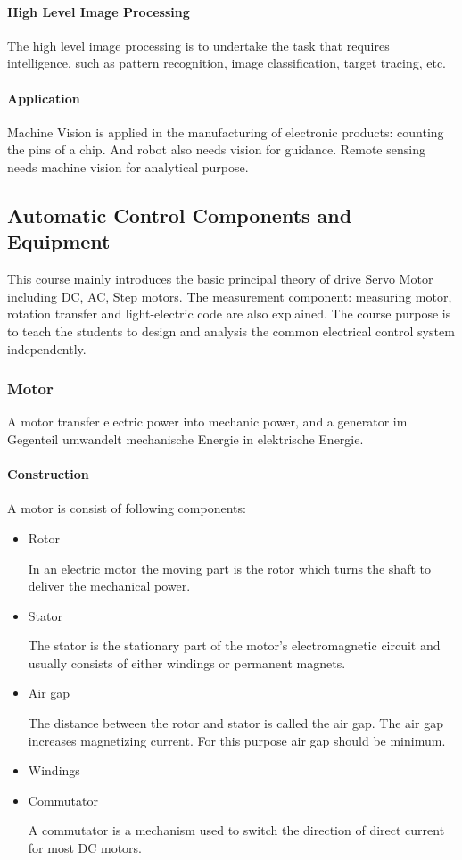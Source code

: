 \paragraph{High Level Image Processing} The high level image processing is to undertake the task that requires intelligence, such as pattern recognition, image classification, target tracing, etc.

\paragraph{Application} Machine Vision is applied in the manufacturing of electronic products: counting the pins of a chip. And robot also needs vision for guidance. Remote sensing needs machine vision for analytical purpose.

\subsection{Automatic Control Components and Equipment}

This course mainly introduces the basic principal theory of drive Servo Motor including DC, AC, Step motors. The measurement component: measuring motor, rotation transfer and light-electric code are also explained. The course purpose is to teach the students to design and analysis the common electrical control system independently.

\subsubsection{Motor}

A motor transfer electric power into mechanic power, and a generator im Gegenteil umwandelt mechanische Energie in elektrische Energie.

\paragraph{Construction}

A motor is consist of following components:
\begin{itemize}
  \item Rotor

  In an electric motor the moving part is the rotor which turns the shaft to deliver the mechanical power.

  \item Stator

  The stator is the stationary part of the motor's electromagnetic circuit and usually consists of either windings or permanent magnets.

  \item Air gap

  The distance between the rotor and stator is called the air gap. The air gap increases magnetizing current. For this purpose air gap should be minimum.

  \item Windings

  \item Commutator

  A commutator is a mechanism used to switch the direction of direct current for most DC motors.
\end{itemize}

